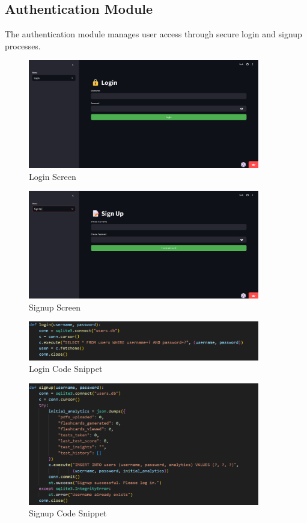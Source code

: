 \documentclass{report}
\begin{document}
\subsection{Authentication Module}
The authentication module manages user access through secure login and signup processes.
\begin{figure}[H]
\centering
\includegraphics[width=0.9\textwidth]{login.png}
\caption{Login Screen}
\end{figure}
\begin{figure}[H]
\centering
\includegraphics[width=0.9\textwidth]{signup.png}
\caption{Signup Screen}
\end{figure}
\begin{figure}[H]
\centering
\includegraphics[width=0.9\textwidth]{login-code.png}
\caption{Login Code Snippet}
\end{figure}
\begin{figure}[H]
\centering
\includegraphics[width=0.9\textwidth]{signup-code.png}
\caption{Signup Code Snippet}
\end{figure}
\end{document}
